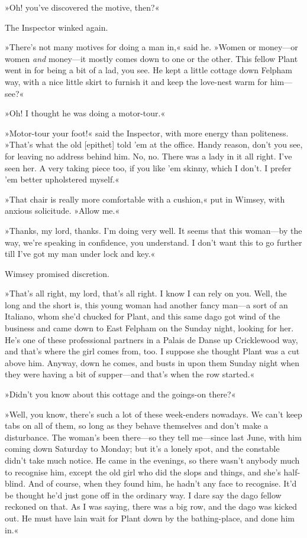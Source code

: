 »Oh! you've discovered the motive, then?«

The Inspector winked again.

»There's not many motives for doing a man in,« said he. »Women or money—or women \textit{and} money—it mostly comes down to one or the other. This fellow Plant went in for being a bit of a lad, you see. He kept a little cottage down Felpham way, with a nice little skirt to furnish it and keep the love-nest warm for him—see?«

»Oh! I thought he was doing a motor-tour.«

»Motor-tour your foot!« said the Inspector, with more energy than politeness. »That's what the old [epithet] told 'em at the office. Handy reason, don't you see, for leaving no address behind him. No, no. There was a lady in it all right. I've seen her. A very taking piece too, if you like 'em skinny, which I don't. I prefer 'em better upholstered myself.«

»That chair is really more comfortable with a cushion,« put in Wimsey, with anxious solicitude. »Allow me.«

»Thanks, my lord, thanks. I'm doing very well. It seems that this woman—by the way, we're speaking in confidence, you understand. I don't want this to go further till I've got my man under lock and key.«

Wimsey promised discretion.

»That's all right, my lord, that's all right. I know I can rely on you. Well, the long and the short is, this young woman had another fancy man—a sort of an Italiano, whom she'd chucked for Plant, and this same dago got wind of the business and came down to East Felpham on the Sunday night, looking for her. He's one of these professional partners in a Palais de Danse up Cricklewood way, and that's where the girl comes from, too. I suppose she thought Plant was a cut above him. Anyway, down he comes, and busts in upon them Sunday night when they were having a bit of supper—and that's when the row started.«

»Didn't you know about this cottage and the goings-on there?«

»Well, you know, there's such a lot of these week-enders nowadays. We can't keep tabs on all of them, so long as they behave themselves and don't make a disturbance. The woman's been there—so they tell me—since last June, with him coming down Saturday to Monday; but it's a lonely spot, and the constable didn't take much notice. He came in the evenings, so there wasn't anybody much to recognise him, except the old girl who did the slops and things, and she's half-blind. And of course, when they found him, he hadn't any face to recognise. It'd be thought he'd just gone off in the ordinary way. I dare say the dago fellow reckoned on that. As I was saying, there was a big row, and the dago was kicked out. He must have lain wait for Plant down by the bathing-place, and done him in.«

